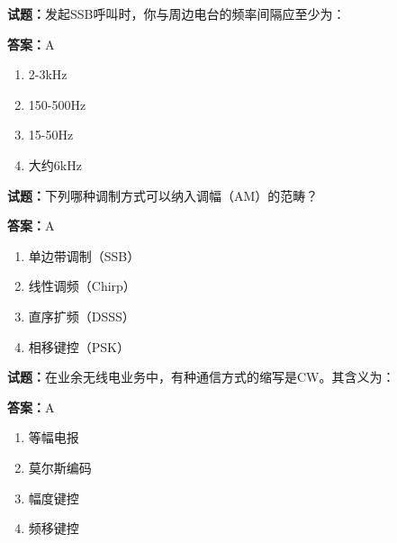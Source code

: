 \documentclass{ctexbook}
\begin{document}




\vspace{1em}

\textbf{试题：}发起SSB呼叫时，你与周边电台的频率间隔应至少为： 

\textbf{答案：}A 

\begin{enumerate}[leftmargin=3em]
  \item 2-3kHz 

  \item 150-500Hz 

  \item 15-50Hz 

  \item 大约6kHz 

\end{enumerate}






\vspace{1em}

\textbf{试题：}下列哪种调制方式可以纳入调幅（AM）的范畴？ 

\textbf{答案：}A 

\begin{enumerate}[leftmargin=3em]
  \item 单边带调制（SSB） 

  \item 线性调频（Chirp） 

  \item 直序扩频（DSSS） 

  \item 相移键控（PSK） 

\end{enumerate}





\vspace{1em}

\textbf{试题：}在业余无线电业务中，有种通信方式的缩写是CW。其含义为： 

\textbf{答案：}A 

\begin{enumerate}[leftmargin=3em]
  \item 等幅电报 

  \item 莫尔斯编码 

  \item 幅度键控 

  \item 频移键控 

\end{enumerate}
\end{document}

